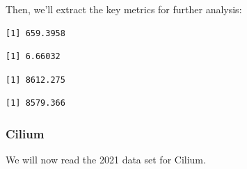 Then, we'll extract the key metrics for further analysis:

\begin{Shaded}
\begin{Highlighting}[]
\SpecialCharTok{\$}
\end{Highlighting}
\end{Shaded}

\begin{verbatim}
[1] 659.3958
\end{verbatim}

\begin{Shaded}
\begin{Highlighting}[]
\SpecialCharTok{\$}
\end{Highlighting}
\end{Shaded}

\begin{verbatim}
[1] 6.66032
\end{verbatim}

\begin{Shaded}
\begin{Highlighting}[]
\SpecialCharTok{\$}
\end{Highlighting}
\end{Shaded}

\begin{verbatim}
[1] 8612.275
\end{verbatim}

\begin{Shaded}
\begin{Highlighting}[]
\SpecialCharTok{\$}
\end{Highlighting}
\end{Shaded}

\begin{verbatim}
[1] 8579.366
\end{verbatim}

\subsubsection{Cilium}

We will now read the 2021 data set for Cilium.

\begin{Shaded}
\begin{Highlighting}[]
\OtherTok{\textless{}{-}} 
\OtherTok{\textless{}{-}} \NormalTok{(}\NormalTok{,}\NormalTok{))}
\end{Highlighting}
\end{Shaded}

